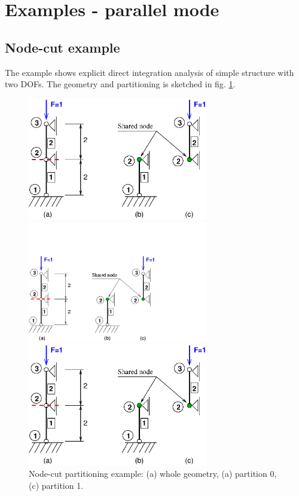 \documentclass[a4paper]{article}
\begin{document}


\section{Examples - parallel mode}
\subsection{Node-cut example}
The example shows explicit direct integration analysis of
simple structure with two DOFs.
The geometry and partitioning is sketched in
fig. \ref{nodecut-ex01}. 

\begin{figure}[htb]
\begin{htmlonly}
  \centerline{\includegraphics[width=0.7\textwidth]{poofem_ex01.eps}}
\end{htmlonly}
\ifpdf
\centerline{\includegraphics[width=0.7\textwidth]{poofem_ex01.pdf}}
\else
\centerline{\includegraphics[width=0.7\textwidth]{poofem_ex01.eps}}
\fi
\caption{Node-cut partitioning example: (a) whole geometry,
(a) partition 0, (c) partition 1.}
\label{nodecut-ex01}
\end{figure}
\end{document}
